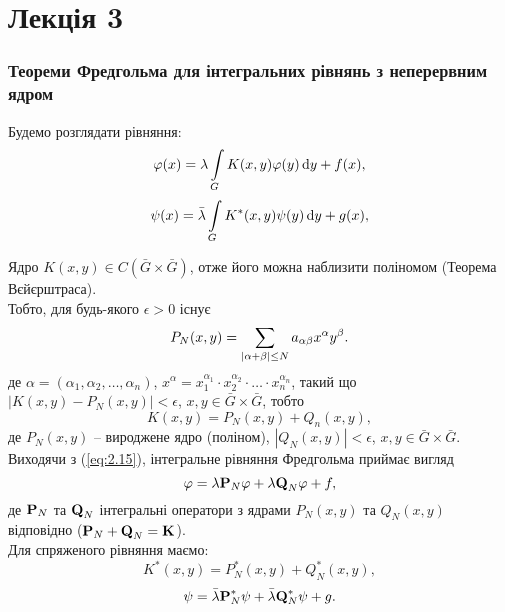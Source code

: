\section*{Лекція 3}
\subsubsection*{Теореми Фредгольма для інтегральних рівнянь з неперервним ядром}

Будемо розглядати рівняння:
\begin{equation}
	\label{eq:2.2}
	\phi(x) = \lambda \Int_G K(x, y) \phi(y) \diff y + f(x),
\end{equation}
\begin{equation}
	\label{eq:2.2'}
	\psi(x) = \bar \lambda \Int_G K^*(x, y) \psi(y) \diff y + g(x),
\end{equation}

Ядро $K(x, y) \in C(\bar G \times \bar G)$, отже його можна наблизити поліномом (Теорема Вєйєрштраса). \\

Тобто, для будь-якого $\epsilon > 0$ існує 
\begin{equation}
	P_N(x, y) = \Sum_{|\alpha + \beta| \le N} a_{\alpha\beta}x^\alpha y^\beta.
\end{equation}
де $\alpha = (\alpha_1, \alpha_2, \ldots, \alpha_n)$, $x^\alpha = x_1^{\alpha_1} \cdot x_2^{\alpha_2} \cdot \ldots \cdot x_n^{\alpha_n}$, такий що $|K(x, y) - P_N(x, y)| < \epsilon$, $x, y \in \bar G \times \bar G$, тобто 
\begin{equation}
	\label{eq:2.15}
	K(x, y) = P_N(x, y) + Q_n(x, y),
\end{equation}
де $P_N(x,y)$ -- вироджене ядро (поліном), $|Q_N(x, y)| < \epsilon$, $x, y \in \bar G \times \bar G$. \\

Виходячи з (\ref{eq:2.15}), інтегральне рівняння Фредгольма приймає вигляд 
\begin{equation}
	\label{eq:2.16}
	\phi = \lambda \bf{P}_N \phi + \lambda \bf{Q}_N \phi + f,
\end{equation}
де $\bf{P}_N$ та $\bf{Q}_N$ інтегральні оператори з ядрами $P_N(x, y)$ та $Q_N(x, y)$ відповідно ($\bf{P}_N + \bf{Q}_N = \bf{K}$). \\

Для спряженого рівняння маємо:
\begin{equation}
	\label{eq:2.15'}
	K^*(x, y) = P_N^*(x, y) + Q_N^*(x, y),
\end{equation}
\begin{equation}
	\label{eq:2.16'}
	\psi = \bar \lambda \bf{P}_N^* \psi + \bar \lambda \bf{Q}_N^* \psi + g.
\end{equation}

